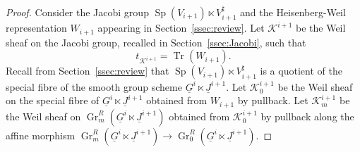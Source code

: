\documentclass[10pt]{amsart}
\theoremstyle{plain}
\theoremstyle{definition}
\DeclareMathOperator{\Gr}{Gr}
\DeclareMathOperator{\trace}{Tr}
\newcommand{\trFrob}[1]{t_{#1}}
\newcommand{\cs}[1]{{\mathcal{#1}}}
\newcommand{\Sp}{{\operatorname{Sp}}}
\begin{document}
\begin{proof}
Consider the Jacobi group $\Sp(V_{i+1})\ltimes V_{i+1}^\sharp$ and the Heisenberg-Weil representation $W_{i+1}$ appearing in Section~\ref{ssec:review}.
Let $\cs{K}^{i+1}$ be the Weil sheaf on the Jacobi group, recalled in Section~\ref{ssec:Jacobi}, such that
\[
\trFrob{\cs{K}^{i+1}} = \trace(W_{i+1}).
\]
Recall from Section~\ref{ssec:review} that $\Sp(V_{i+1})\ltimes V_{i+1}^\sharp$ is a quotient of the special fibre of the smooth group scheme $\underline{G}^{i} \ltimes \underline{J}^{i+1}$.
Let $\cs{K}_0^{i+1}$ be the Weil sheaf on the special fibre of $\underline{G}^{i} \ltimes \underline{J}^{i+1}$ obtained from $W_{i+1}$ by pullback. 
Let $\cs{K}_m^{i+1}$ be the Weil sheaf on $\Gr^{R}_m(\underline{G}^{i} \ltimes \underline{J}^{i+1})$ obtained from $\cs{K}_0^{i+1}$ by pullback along the affine morphism
$\Gr^{R}_m(\underline{G}^{i} \ltimes \underline{J}^{i+1}) \to \Gr^{R}_0(\underline{G}^{i} \ltimes \underline{J}^{i+1})$.


\end{proof}
\end{document}
